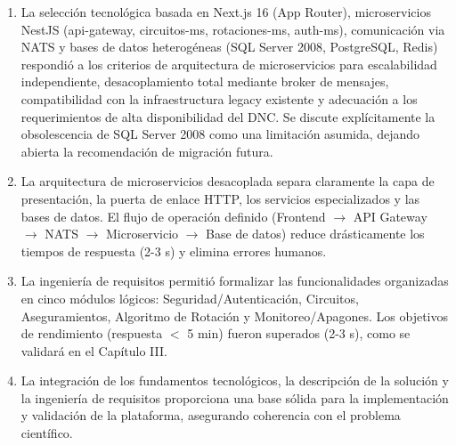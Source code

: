 \begin{enumerate}
    \item La selección tecnológica basada en Next.js 16 (App Router), microservicios NestJS (api-gateway, circuitos-ms, rotaciones-ms, auth-ms), comunicación via NATS y bases de datos heterogéneas (SQL Server 2008, PostgreSQL, Redis) respondió a los criterios de arquitectura de microservicios para escalabilidad independiente, desacoplamiento total mediante broker de mensajes, compatibilidad con la infraestructura legacy existente y adecuación a los requerimientos de alta disponibilidad del DNC. Se discute explícitamente la obsolescencia de SQL Server 2008 como una limitación asumida, dejando abierta la recomendación de migración futura.
    
    \item La arquitectura de microservicios desacoplada separa claramente la capa de presentación, la puerta de enlace HTTP, los servicios especializados y las bases de datos. El flujo de operación definido (Frontend $\rightarrow$ API Gateway $\rightarrow$ NATS $\rightarrow$ Microservicio $\rightarrow$ Base de datos) reduce drásticamente los tiempos de respuesta (2-3 s) y elimina errores humanos.
    
    \item La ingeniería de requisitos permitió formalizar las funcionalidades organizadas en cinco módulos lógicos: Seguridad/Autenticación, Circuitos, Aseguramientos, Algoritmo de Rotación y Monitoreo/Apagones. Los objetivos de rendimiento (respuesta $<$ 5 min) fueron superados (2-3 s), como se validará en el Capítulo III.
    
    \item La integración de los fundamentos tecnológicos, la descripción de la solución y la ingeniería de requisitos proporciona una base sólida para la implementación y validación de la plataforma, asegurando coherencia con el problema científico.
\end{enumerate}